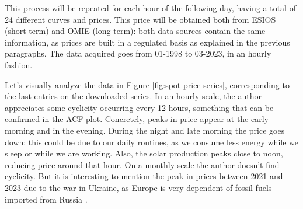 This process will be repeated for each hour of the following day, having a total of 24 different curves and prices. This price will be obtained both from ESIOS (short term) and OMIE (long term): both data sources contain the same information, as prices are built in a regulated basis as explained in the previous paragraphs. The data acquired goes from 01-1998 to 03-2023, in an hourly fashion.

Let's visually analyze the data in Figure \ref{fig:spot-price-series}, corresponding to the last entries on the downloaded series. In an hourly scale, the author appreciates some cyclicity occurring every 12 hours, something that can be confirmed in the ACF plot.
Concretely, peaks in price appear at the early morning and in the evening.
During the night and late morning the price goes down: this could be due to our daily routines, as we consume less energy while we sleep or while we are working. Also, the solar production peaks close to noon, reducing price around that hour.
On a monthly scale the author doesn't find cyclicity. But it is interesting to mention the peak in prices between 2021 and 2023 due to the war in Ukraine, as Europe is very dependent of fossil fuels imported from Russia \cite{lopez2022geopolitica}.


